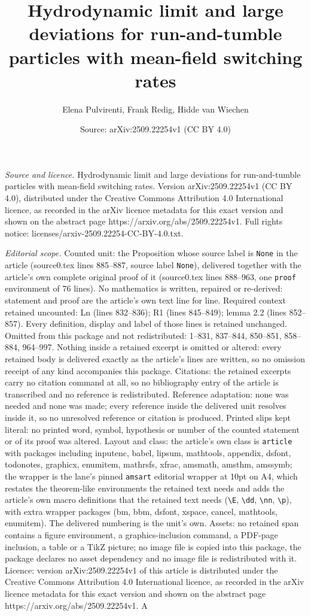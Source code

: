\documentclass[10pt,a4paper]{amsart}
\title[Hydrodynamic limit and large deviations for run-and-tumble p]{Hydrodynamic limit and large deviations for run-and-tumble particles with mean-field switching rates}
\author{Elena Pulvirenti, Frank Redig, Hidde van Wiechen}
\date{Source: arXiv:2509.22254v1 (CC BY 4.0)}
\begin{document}
\maketitle

\noindent\emph{Source and licence.} Hydrodynamic limit and large deviations for run-and-tumble particles with mean-field switching rates. Version arXiv:2509.22254v1 (CC BY 4.0), distributed under the Creative Commons Attribution 4.0 International licence, as recorded in the arXiv licence metadata for this exact version and shown on the abstract page https://arxiv.org/abs/2509.22254v1. Full rights notice: licenses/arxiv-2509.22254-CC-BY-4.0.txt.\par\smallskip

\noindent\textit{Editorial scope.} Counted unit: the Proposition whose source label is \texttt{None} in the article (source0.tex lines 885--887, source label \texttt{None}), delivered together with the article's own complete original proof of it (source0.tex lines 888--963, one \texttt{proof} environment of 76 lines). No mathematics is written, repaired or re-derived: statement and proof are the article's own text line for line. Required context retained uncounted: Ln (lines 832--836); R1 (lines 845--849); lemma 2.2 (lines 852--857). Every definition, display and label of those lines is retained unchanged. Omitted from this package and not redistributed: 1--831, 837--844, 850--851, 858--884, 964--997. Nothing inside a retained excerpt is omitted or altered: every retained body is delivered exactly as the article's lines are written, so no omission receipt of any kind accompanies this package. Citations: the retained excerpts carry no citation command at all, so no bibliography entry of the article is transcribed and no reference is redistributed. Reference adaptation: none was needed and none was made; every reference inside the delivered unit resolves inside it, so no unresolved reference or citation is produced. Printed slips kept literal: no printed word, symbol, hypothesis or number of the counted statement or of its proof was altered. Layout and class: the article's own class is \texttt{article} with packages including inputenc, babel, lipsum, mathtools, appendix, dsfont, todonotes, graphicx, enumitem, mathrsfs, xfrac, amsmath, amsthm, amssymb; the wrapper is the lane's pinned \texttt{amsart} editorial wrapper at 10pt on A4, which restates the theorem-like environments the retained text needs and adds the article's own macro definitions that the retained text needs (\texttt{\textbackslash E}, \texttt{\textbackslash dd}, \texttt{\textbackslash nn}, \texttt{\textbackslash p}), with extra wrapper packages (bm, bbm, dsfont, xspace, cancel, mathtools, enumitem). The delivered numbering is the unit's own. Assets: no retained span contains a figure environment, a graphics-inclusion command, a PDF-page inclusion, a table or a TikZ picture; no image file is copied into this package, the package declares no asset dependency and no image file is redistributed with it. Licence: version arXiv:2509.22254v1 of this article is distributed under the Creative Commons Attribution 4.0 International licence, as recorded in the arXiv licence metadata for this exact version and shown on the abstract page https://arxiv.org/abs/2509.22254v1. A 
\end{document}
